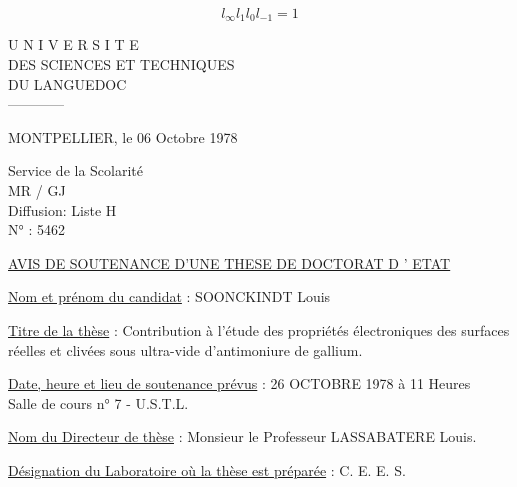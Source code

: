 {%
}

\[
l_{\infty}l_1l_0l_{-1}=1
\]



\begin{center}
U N I V E R S I T E\\
DES SCIENCES ET TECHNIQUES\\
DU LANGUEDOC\\
------------
\end{center}

MONTPELLIER, le 06 Octobre 1978

Service de la Scolarité\\
MR / GJ\\
Diffusion\quad : Liste H\\
N° : 5462

\begin{center}
\uline{AVIS DE SOUTENANCE D'UNE THESE DE DOCTORAT D ' ETAT}
\end{center}

\uline{Nom et prénom du candidat} : SOONCKINDT Louis

\uline{Titre de la thèse} : Contribution à l'étude des propriétés électroniques des surfaces réelles et clivées sous ultra-vide d'antimoniure de gallium.

\uline{Date, heure et lieu de soutenance prévus} : 26 OCTOBRE 1978 à 11 Heures\\
Salle de cours n° 7 - U.S.T.L.

\uline{Nom du Directeur de thèse} : Monsieur le Professeur LASSABATERE Louis.

\uline{Désignation du Laboratoire où la thèse est préparée} : C. E. E. S.

